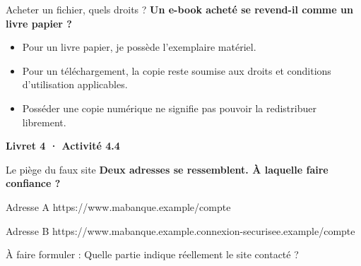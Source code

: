 \documentclass[aspectratio=169,11pt]{beamer}
\newcommand{\question}[1]{{\Large\color{or}\bfseries #1}}
\newcommand{\reperes}[1]{\vfill{\color{rose}\footnotesize À faire formuler : }{\footnotesize #1}}
\begin{document}
\begin{frame}{Acheter un fichier, quels droits ?}
\question{Un e-book acheté se revend-il comme un livre papier ?}
\vspace{6mm}
\begin{itemize}\setlength{\itemsep}{5mm}
\item Pour un livre papier, je possède l'exemplaire matériel.
\pause
\item Pour un téléchargement, la copie reste soumise aux droits et conditions d'utilisation applicables.
\pause
\item Posséder une copie numérique ne signifie pas pouvoir la redistribuer librement.
\end{itemize}
\vfill
\begin{center}{\Large\color{or}\bfseries Livret 4 · Activité 4.4}\end{center}
\end{frame}

\begin{frame}{Le piège du faux site}
\question{Deux adresses se ressemblent. À laquelle faire confiance ?}
\vspace{5mm}
\begin{block}{Adresse A}
\ttfamily https://www.mabanque.example/compte
\end{block}
\vspace{3mm}
\begin{block}{Adresse B}
\ttfamily https://www.mabanque.example.connexion-securisee.example/compte
\end{block}
\pause
\vspace{5mm}
\reperes{Quelle partie indique réellement le site contacté ?}
\end{frame}
\end{document}
